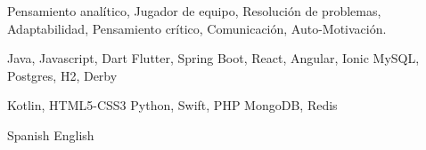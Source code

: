 
\begin{cvparagraph}
Pensamiento analítico, Jugador de equipo, Resolución de problemas, Adaptabilidad, Pensamiento crítico, Comunicación, Auto-Motivación.
\end{cvparagraph}

\begin{multicols}{3}
  \begin{cvskills}
    \cvskill
      {Java, Javascript, Dart} %
      {\faStar\faStar\faStar\faStar\faStarHalfEmpty} %
    \cvskill
      {Flutter, Spring Boot, React, Angular, Ionic} %
      {\faStar\faStar\faStar\faStar\faStarHalfEmpty} %
    \cvskill
      {MySQL, Postgres, H2, Derby} %
      {\faStar\faStar\faStar\faStar\faStarHalfEmpty} %
  \end{cvskills}

  \columnbreak

  \begin{cvskills}
    \cvskill
      {Kotlin, HTML5-CSS3} %
      {\faStar\faStar\faStar\faStarHalfEmpty\faStarO} %
    \cvskill
      {{\hphantom{Empty}} Python, Swift, PHP} %
      {\faStar\faStar\faStar\faStarHalfEmpty\faStarO} %
    \cvskill
      {MongoDB, Redis} %
      {\faStar\faStar\faStar\faStarHalfEmpty\faStarO} %
  \end{cvskills}

  \columnbreak

  \begin{cvskills}
    \cvskill
      {Spanish} %
      {\faStar\faStar\faStar\faStar\faStar} %
    \cvskill
      {English} %
      {\faStar\faStar\faStar\faStarHalfEmpty\faStarO} %
  \end{cvskills}
\end{multicols}
